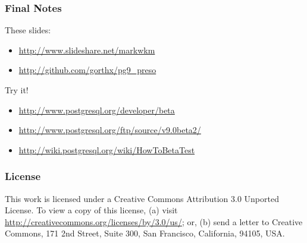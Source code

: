 \documentclass{beamer}
\begin{document}
\frame
{
  \frametitle{Final Notes}

  These slides:\\
  \begin{itemize}
  \item[] \url{http://www.slideshare.net/markwkm}
  \item[] \url{http://github.com/gorthx/pg9\_preso}
  \end{itemize}

  Try it!\\
  \begin{itemize}
  \item[] \url{http://www.postgresql.org/developer/beta}
  \item[] \url{http://www.postgresql.org/ftp/source/v9.0beta2/}
  \item[] \url{http://wiki.postgresql.org/wiki/HowToBetaTest}
  \end{itemize}
}


\frame
{
  \frametitle{License}

  This work is licensed under a Creative Commons Attribution 3.0
  Unported License. To view a copy of this license, (a) visit
  \url{http://creativecommons.org/licenses/by/3.0/us/}; or, (b) send a
  letter to Creative Commons, 171 2nd Street, Suite 300, San Francisco,
  California, 94105, USA.
}
\end{document}
